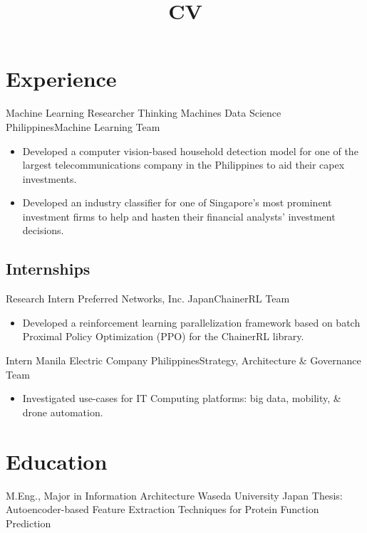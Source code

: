 \documentclass[11pt,a4paper,sans]{moderncv}
\title{CV}
\begin{document}
\maketitle

\section{Experience}
{Machine Learning Researcher}
{Thinking Machines Data Science}
{Philippines}{Machine Learning Team}
{
    \begin{itemize}
        \item Developed a computer vision-based household detection
              model for one of the largest telecommunications company in
              the Philippines to aid their capex investments.
        \item Developed an industry classifier for one of Singapore's
              most prominent investment firms to help and hasten their
              financial analysts' investment decisions.
    \end{itemize}
}

\subsection{Internships}

{Research Intern}
{Preferred Networks, Inc.}
{Japan}{ChainerRL Team}
{
    \begin{itemize}
        \item Developed a reinforcement learning parallelization
              framework based on batch Proximal Policy Optimization (PPO)
              for the ChainerRL library.
    \end{itemize}
}

{Intern}
{Manila Electric Company}
{Philippines}{Strategy, Architecture \& Governance Team}
{
    \begin{itemize}
        \item Investigated use-cases for IT Computing platforms: big
              data, mobility, \& drone automation.
    \end{itemize}
}


\section{Education}
{M.Eng., Major in Information Architecture}
{Waseda University}
{Japan}{}
{Thesis: Autoencoder-based Feature Extraction Techniques for Protein
    Function Prediction}
\end{document}
